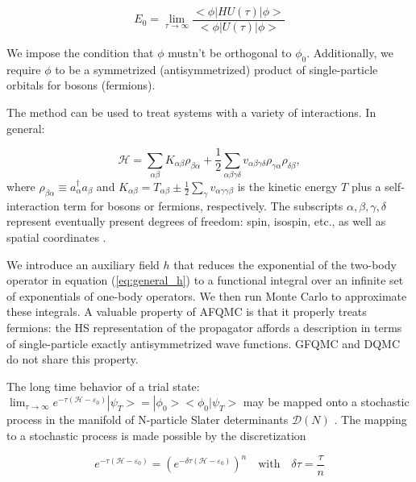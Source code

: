\documentclass[10pt, twocolumn, twoside]{article}
\begin{document}
\begin{equation}
E_0 = \lim_{\tau \rightarrow \infty} \frac{<\phi | HU(\tau) | \phi >}{<\phi | U(\tau) | \phi >}
\end{equation}

We impose the condition that $\phi$ mustn't be orthogonal to $\phi_0$. Additionally, we require $\phi$ to be a symmetrized (antisymmetrized) product of single-particle orbitals for bosons (fermions).\par

The method can be used to treat systems with a variety of interactions. In general:

\begin{equation}\label{eq:general_h}
\mathcal{H} = \sum_{\alpha\beta} K_{\alpha\beta} \rho_{\beta\alpha} +\frac{1}{2} \sum_{\alpha\beta\gamma\delta} v_{\alpha\beta\gamma\delta} \rho_{\gamma\alpha} \rho_{\delta\beta} ,
\end{equation}
where $\rho_{\beta\alpha}\equiv a_\alpha^\dagger a_\beta$ and
$K_{\alpha\beta} = T_{\alpha\beta} \pm \frac{1}{2} \sum_{\gamma} v_{\alpha\gamma\gamma\beta}$
is the kinetic energy $T$ plus a self-interaction term for bosons or fermions, respectively. The subscripts ${\alpha, \beta, \gamma, \delta}$ represent eventually present degrees of freedom: spin, isospin, etc., as well as spatial coordinates \cite{sugiyama}.\par

We introduce an auxiliary field $h$ that reduces the exponential of the two-body operator in equation (\ref{eq:general_h}) to a functional integral over an infinite set of exponentials of one-body operators. We then run Monte Carlo to approximate these integrals. A valuable property of AFQMC is that it properly treats fermions: the HS representation of the propagator affords a description in terms of single-particle exactly antisymmetrized wave functions. GFQMC and DQMC do not share this property.\par

The long time behavior of a trial state: $\lim_{\tau \rightarrow \infty } e^{-\tau (\mathcal{H} - \varepsilon_0)} |\psi_T > = | \phi_0 > < \phi_0 | \psi_T >$ may be mapped onto a stochastic process in the manifold of N-particle Slater determinants $\mathcal{D}(N)$ \cite{zhang}. The mapping to a stochastic process is made possible by the discretization

\begin{equation}
e^{-\tau (\mathcal{H} - \varepsilon_0)} = (e^{-\delta \tau ( \mathcal{H} - \varepsilon_0 ) })^n \quad \text{with} \quad \delta \tau = \frac{\tau}{n}
\end{equation}
\end{document}
